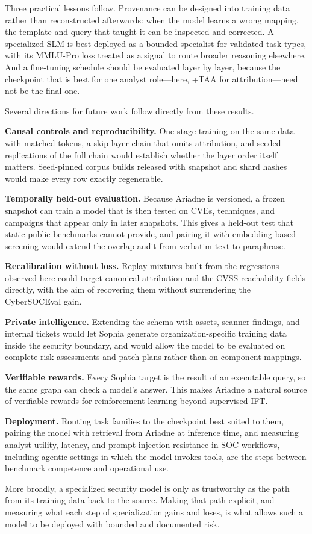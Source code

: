 \documentclass[conference]{IEEEtran}
\begin{document}
Three practical lessons follow. Provenance can be designed into training data rather than reconstructed afterwards: when the model learns a wrong mapping, the template and query that taught it can be inspected and corrected. A specialized SLM is best deployed as a bounded specialist for validated task types, with its MMLU-Pro loss treated as a signal to route broader reasoning elsewhere. And a fine-tuning schedule should be evaluated layer by layer, because the checkpoint that is best for one analyst role---here, +TAA for attribution---need not be the final one.

Several directions for future work follow directly from these results.

\textbf{Causal controls and reproducibility.} One-stage training on the same data with matched tokens, a skip-layer chain that omits attribution, and seeded replications of the full chain would establish whether the layer order itself matters. Seed-pinned corpus builds released with snapshot and shard hashes would make every row exactly regenerable.

\textbf{Temporally held-out evaluation.} Because Ariadne is versioned, a frozen snapshot can train a model that is then tested on CVEs, techniques, and campaigns that appear only in later snapshots. This gives a held-out test that static public benchmarks cannot provide, and pairing it with embedding-based screening would extend the overlap audit from verbatim text to paraphrase.

\textbf{Recalibration without loss.} Replay mixtures built from the regressions observed here could target canonical attribution and the CVSS reachability fields directly, with the aim of recovering them without surrendering the CyberSOCEval gain.

\textbf{Private intelligence.} Extending the schema with assets, scanner findings, and internal tickets would let Sophia generate organization-specific training data inside the security boundary, and would allow the model to be evaluated on complete risk assessments and patch plans rather than on component mappings.

\textbf{Verifiable rewards.} Every Sophia target is the result of an executable query, so the same graph can check a model's answer. This makes Ariadne a natural source of verifiable rewards for reinforcement learning beyond supervised IFT.

\textbf{Deployment.} Routing task families to the checkpoint best suited to them, pairing the model with retrieval from Ariadne at inference time, and measuring analyst utility, latency, and prompt-injection resistance in SOC workflows, including agentic settings in which the model invokes tools, are the steps between benchmark competence and operational use.

More broadly, a specialized security model is only as trustworthy as the path from its training data back to the source. Making that path explicit, and measuring what each step of specialization gains and loses, is what allows such a model to be deployed with bounded and documented risk.



\end{document}
